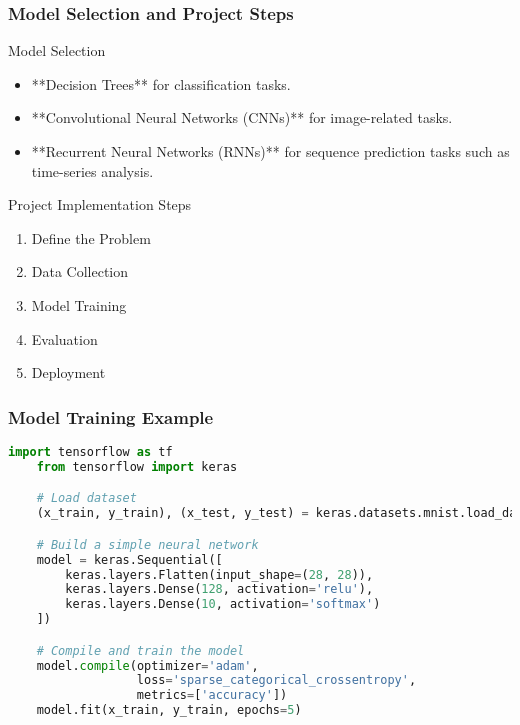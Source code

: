 \documentclass[aspectratio=169]{beamer}
\begin{document}
\begin{frame}[fragile]
    \frametitle{Model Selection and Project Steps}
    \begin{block}{Model Selection}
        \begin{itemize}
            \item **Decision Trees** for classification tasks.
            \item **Convolutional Neural Networks (CNNs)** for image-related tasks.
            \item **Recurrent Neural Networks (RNNs)** for sequence prediction tasks such as time-series analysis.
        \end{itemize}
    \end{block}

    \begin{block}{Project Implementation Steps}
        \begin{enumerate}
            \item Define the Problem
            \item Data Collection
            \item Model Training
            \item Evaluation
            \item Deployment
        \end{enumerate}
    \end{block}
\end{frame}

\begin{frame}[fragile]
    \frametitle{Model Training Example}
    \begin{lstlisting}[language=Python]
    import tensorflow as tf
    from tensorflow import keras

    # Load dataset
    (x_train, y_train), (x_test, y_test) = keras.datasets.mnist.load_data()

    # Build a simple neural network
    model = keras.Sequential([
        keras.layers.Flatten(input_shape=(28, 28)),
        keras.layers.Dense(128, activation='relu'),
        keras.layers.Dense(10, activation='softmax')
    ])

    # Compile and train the model
    model.compile(optimizer='adam', 
                  loss='sparse_categorical_crossentropy', 
                  metrics=['accuracy'])
    model.fit(x_train, y_train, epochs=5)
    \end{lstlisting}
\end{frame}
\end{document}

